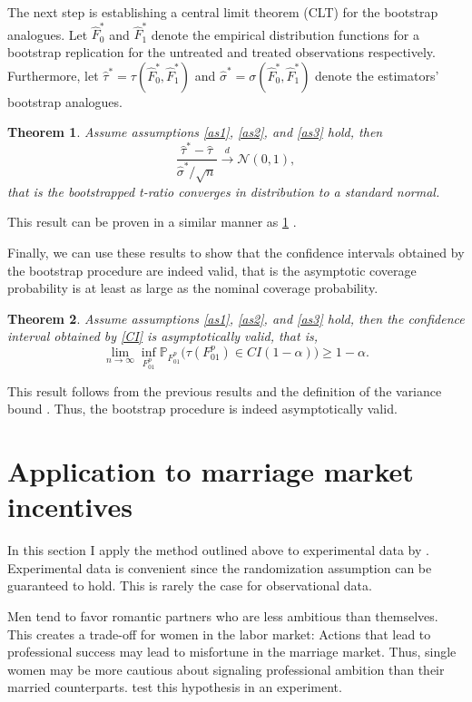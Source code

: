 \documentclass[aodsor,preprint]{imsart}
\numberwithin{equation}{section}
\theoremstyle{plain}
\newtheorem{thm}{Theorem}[section]
\begin{document}
The next step is establishing a central limit theorem (CLT) for the bootstrap analogues. Let $\widehat{F}_0^*$ and $\widehat{F}_1^*$ denote the empirical distribution functions for a bootstrap replication for the untreated and treated observations respectively. Furthermore, let $\widehat{\tau}^* = \tau(\widehat{F}_0^*, \widehat{F}_1^*)$ and $\widehat{\sigma}^* = \sigma(\widehat{F}_0^*, \widehat{F}_1^*)$ denote the estimators' bootstrap analogues.
		
\begin{thm} \label{Thm3.2}
	Assume assumptions \ref{as1}, \ref{as2}, and \ref{as3} hold, then
	$$
	\frac{\widehat{\tau}^* - \widehat{\tau}}{\widehat{\sigma}^* / \sqrt{n}} \overset{d}{\to} \mathcal{N} \left( 0, 1 \right),
	$$
	that is the bootstrapped t-ratio converges in distribution to a standard normal.
\end{thm}

This result can be proven in a similar manner as \ref{Thm3.2} \citep[see][section 5 and Appendix C]{Imbens_2021}.

Finally, we can use these results to show that the confidence intervals obtained by the bootstrap procedure are indeed valid, that is the asymptotic coverage probability is at least as large as the nominal coverage probability.

\begin{thm}
	Assume assumptions \ref{as1}, \ref{as2}, and \ref{as3} hold, then the confidence interval obtained by \ref{CI} is asymptotically valid, that is,
	$$
	\lim_{n \to \infty} \inf_{F_{01}^p} \mathbb{P}_{F_{01}^p} \big(\tau(F_{01}^p) \in CI(1-\alpha) \big) \geq 1 - \alpha.
	$$
\end{thm}

This result follows from the previous results and the definition of the variance bound \citep[see][Corollary 5.1]{Imbens_2021}. Thus, the bootstrap procedure is indeed asymptotically valid.



\section{Application to marriage market incentives} \label{application}

In this section I apply the method outlined above to experimental data by \cite{Bursztyn_2017}. Experimental data is convenient since the randomization assumption can be guaranteed to hold. This is rarely the case for observational data. 

Men tend to favor romantic partners who are less ambitious than themselves. This creates a trade-off for women in the labor market: Actions that lead to professional success may lead to misfortune in the marriage market. Thus, single women may be more cautious about signaling professional ambition than their married counterparts. \cite{Bursztyn_2017} test this hypothesis in an experiment.
\end{document}
